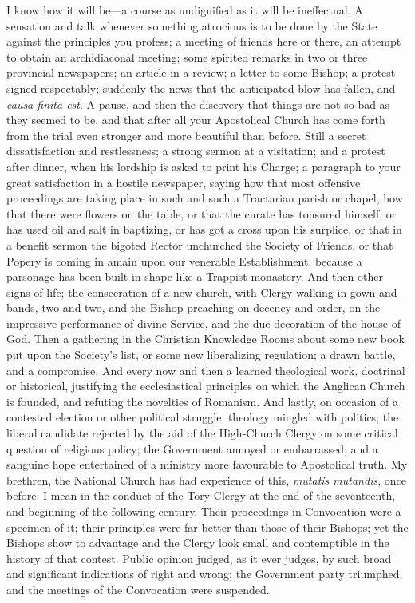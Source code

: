 I know how it will be—a course as undignified as it will be
ineffectual. A sensation and talk whenever something atrocious is to
be done by the State against the principles you profess; a meeting of
friends here or there, an attempt to obtain an archidiaconal meeting;
some spirited remarks in two or three provincial newspapers; an
article in a review; a letter to some Bishop; a protest signed
respectably; suddenly the news that the anticipated blow has fallen,
and \emph{causa finita est}. A pause, and then the discovery that
things are not so bad as they seemed to be, and that after all your
Apostolical Church has come forth from the trial even stronger and
more beautiful than before. Still a secret dissatisfaction and
restlessness; a strong sermon at a visitation; and a protest after
dinner, when his lordship is asked to print his Charge; a paragraph
to your great satisfaction in a hostile newspaper, saying how that
most offensive proceedings are taking place in such and such a
Tractarian parish or chapel, how that there were flowers on the table,
or that the curate has tonsured himself, or has used oil and salt in
baptizing, or has got a cross upon his surplice, or that in a benefit
sermon the bigoted Rector unchurched the Society of Friends, or that
Popery is coming in amain upon our venerable Establishment, because a
parsonage has been built in shape like a Trappist monastery. And then
other signs of life; the consecration of a new church, with Clergy
walking in gown and bands, two and two, and the Bishop preaching on
decency and order, on the impressive performance of divine Service,
and the due decoration of the house of God. Then a gathering in the
Christian Knowledge Rooms about some new book put upon the Society's
list, or some new liberalizing regulation; a drawn battle, and a
compromise. And every now and then a learned theological work,
doctrinal or historical, justifying the ecclesiastical principles on
which the Anglican Church is founded, and refuting the novelties of
Romanism. And lastly, on occasion of a contested election or other
political struggle, theology mingled with politics; the liberal
candidate rejected by the aid of the High-Church Clergy on some
critical question of religious policy; the Government annoyed or
embarrassed; and a sanguine hope entertained of a ministry more
favourable to Apostolical truth. My brethren, the National Church has
had experience of this, \emph{mutatis mutandis}, once before: I mean
in the conduct of the Tory Clergy at the end of the seventeenth, and
beginning of the following century. Their proceedings in Convocation
were a specimen of it; their principles were far better than those of
their Bishops; yet the Bishops show to advantage and the Clergy look
small and contemptible in the history of that contest. Public opinion
judged, as it ever judges, by such broad and significant indications
of right and wrong; the Government party triumphed, and the meetings
of the Convocation were suspended.

